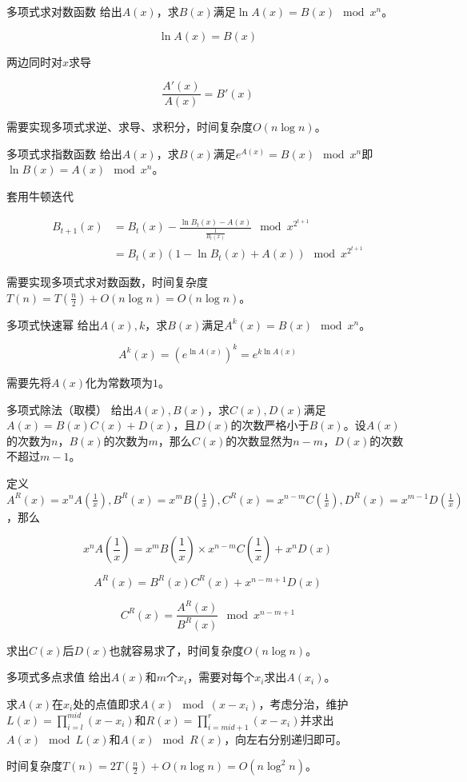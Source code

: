 \documentclass{beamer}
\begin{document}
	\begin{frame}{多项式求对数函数}
		给出$A(x)$，求$B(x)$满足$\ln A(x)=B(x) \mod x^n$。
		
		$$\ln A(x)=B(x)$$
		
		两边同时对$x$求导
		
		$$\frac{A'(x)}{A(x)}=B'(x)$$
		
		需要实现多项式求逆、求导、求积分，时间复杂度$O(n\log n)$。
	\end{frame}
	\begin{frame}{多项式求指数函数}
		给出$A(x)$，求$B(x)$满足$e^{A(x)}=B(x) \mod x^n$即$\ln B(x) = A(x) \mod x^n$。 
		
		套用牛顿迭代
		
		$$\begin{aligned}B_{t+1}(x)&=B_t(x)-\frac{\ln B_t(x)-A(x)}{\frac{1}{B_t(x)}} \mod x^{2^{t+1}}\\&=B_t(x)(1-\ln B_t(x)+A(x))\mod x^{2^{t+1}}\end{aligned}$$ 
		
		需要实现多项式求对数函数，时间复杂度$T(n)=T(\frac n2)+O(n\log n)=O(n\log n)$。
	\end{frame}
	\begin{frame}{多项式快速幂}
		给出$A(x),k$，求$B(x)$满足$A^k(x)=B(x) \mod x^n$。
		
		$$A^k(x)=(e^{\ln A(x)})^k=e^{k\ln A(x)}$$
		
		需要先将$A(x)$化为常数项为$1$。
	\end{frame}
	\begin{frame}{多项式除法（取模）}
		给出$A(x),B(x)$，求$C(x),D(x)$满足$A(x)=B(x)C(x)+D(x)$，且$D(x)$的次数严格小于$B(x)$。设$A(x)$的次数为$n$，$B(x)$的次数为$m$，那么$C(x)$的次数显然为$n-m$，$D(x)$的次数不超过$m-1$。
		
		定义$A^R(x)=x^nA(\frac 1x),B^R(x)=x^mB(\frac 1x),C^R(x)=x^{n-m}C(\frac 1x), D^R(x)=x^{m-1}D(\frac{1}{x})$，那么
		
		$$x^nA(\frac 1x)=x^mB(\frac 1x)\times x^{n-m}C(\frac 1x) + x^nD(x)$$
		
		$$A^R(x)=B^R(x)C^R(x)+x^{n-m+1}D(x)$$
		
		$$C^R(x)=\frac{A^R(x)}{B^R(x)} \mod x^{n-m+1}$$
		
		求出$C(x)$后$D(x)$也就容易求了，时间复杂度$O(n\log n)$。
	\end{frame}
	\begin{frame}{多项式多点求值}
		给出$A(x)$和$m$个$x_i$，需要对每个$x_i$求出$A(x_i)$。
		
		求$A(x)$在$x_i$处的点值即求$A(x) \mod (x-x_i)$，考虑分治，维护$L(x)=\prod_{i=l}^{mid}(x-x_i)$和$R(x)=\prod_{i=mid+1}^r(x-x_i)$并求出$A(x) \mod L(x)$和$A(x) \mod R(x)$，向左右分别递归即可。
		
		时间复杂度$T(n)=2T(\frac n2)+O(n\log n)=O(n\log^2n)$。
	\end{frame}
\end{document}

